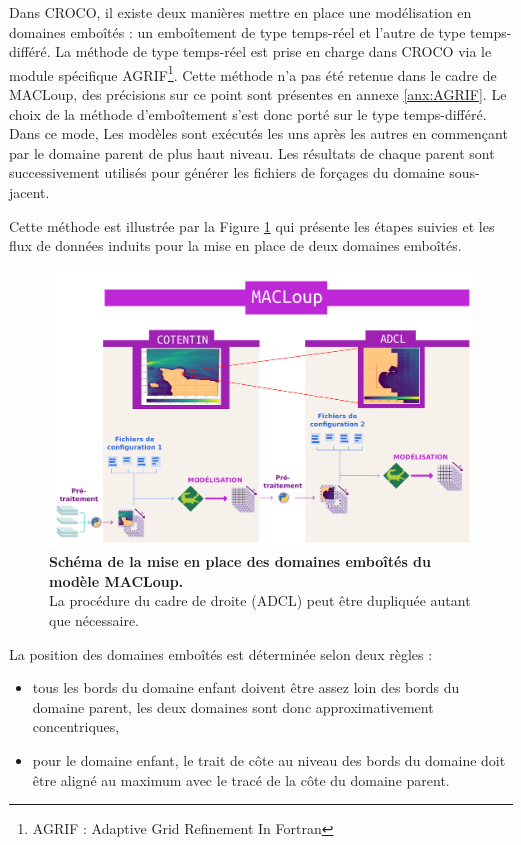 \documentclass[10pt,a4paper,titlepage]{article}
\begin{document}
Dans CROCO, il existe deux manières mettre en place une modélisation en domaines emboîtés : un emboîtement de type temps-réel et l'autre de type temps-différé.
La méthode de type temps-réel est prise en charge dans CROCO via le module spécifique AGRIF\footnote{AGRIF : Adaptive Grid Refinement In Fortran}.
Cette méthode n'a pas été retenue dans le cadre de MACLoup, des précisions sur ce point sont présentes en annexe \ref{anx:AGRIF}.
Le choix de la méthode d'emboîtement s'est donc porté sur le type temps-différé.
Dans ce mode, Les modèles sont exécutés les uns après les autres en commençant par le domaine parent de plus haut niveau.
Les résultats de chaque parent sont successivement utilisés pour générer les fichiers de forçages du domaine sous-jacent.

Cette méthode est illustrée par la Figure \ref{fig:imbrication_workflow} qui présente les étapes suivies et les flux de données induits pour la mise en place de deux domaines emboîtés.

\begin{figure}[H]
    \centering
    \includegraphics[scale=0.35]{../images/workflow/multi_grid.pdf}
    \caption{\textbf{Schéma de la mise en place des domaines emboîtés du modèle MACLoup.}\\
        La procédure du cadre de droite (ADCL) peut être dupliquée autant que nécessaire.}
    \label{fig:imbrication_workflow}
\end{figure}


La position des domaines emboîtés est déterminée selon deux règles :
\begin{itemize}
	\item tous les bords du domaine enfant doivent être assez loin des bords du domaine parent, les deux domaines sont donc approximativement concentriques,
	\item pour le domaine enfant, le trait de côte au niveau des bords du domaine doit être aligné au maximum avec le tracé de la côte du domaine parent.
\end{itemize}
\end{document}
